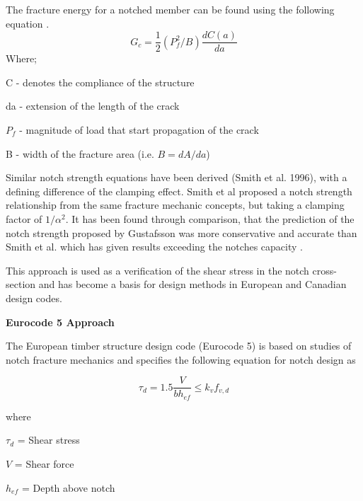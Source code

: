 \documentclass[11pt,a4paper]{article}
\numberwithin{equation}{subsection}
\begin{document}
	\noindent 	
	The fracture energy for a notched member can be found using the following equation \cite{serrano_fracture_2007}.  	 	
	\begin{equation} 		
	G_{c} = \dfrac{1}{2}(P_{f}^{2}/B) \dfrac{dC(a)}{da}  	\end{equation} 	 	
	Where;\par 	
	C - denotes the compliance of the structure\par 	
	da - extension of the length of the crack\par 	
	$P_{f}$ - magnitude of load that start propagation of the crack\par 	
	B - width of the fracture area (i.e. $B = dA/da$) 
	   
	 \vspace*{\baselineskip} 	 	
	 
	 \noindent 
	 Similar notch strength equations have been derived (Smith et al. 1996), with a defining difference of the clamping effect. Smith et al proposed a notch strength relationship from the same fracture mechanic concepts, but taking a clamping factor of $1/\alpha^{2}$. It has been found through comparison, that the prediction of the notch strength proposed by Gustafsson was more conservative and accurate than Smith et al. which has given results exceeding the notches capacity \cite{jockwer_state---art_2013}.   	
	 
	 \vspace*{\baselineskip} 	 	
	 
	 \noindent 	This approach is used as a verification of the shear stress in the notch cross-section and has become a basis for design methods in European and Canadian design codes.
	
	\vspace*{\baselineskip}
	
	\noindent
	\textbf{Eurocode 5 Approach}\par
	
	\noindent
	The European timber structure design code (Eurocode 5) is based on studies of notch fracture mechanics and specifies the following equation for notch design as
	 
	\begin{equation}
	\tau_{d} = 1.5\dfrac{V}{b h_{ef}} \leq k_{v} f_{v,d} 
	\label{eq:Euro}
	\end{equation}
     
     where\par
     $ \tau_{d} $ = Shear stress \par
     $ V $ = Shear force \par
     $ h_{ef} $ = Depth above notch \par    
     
\end{document}
